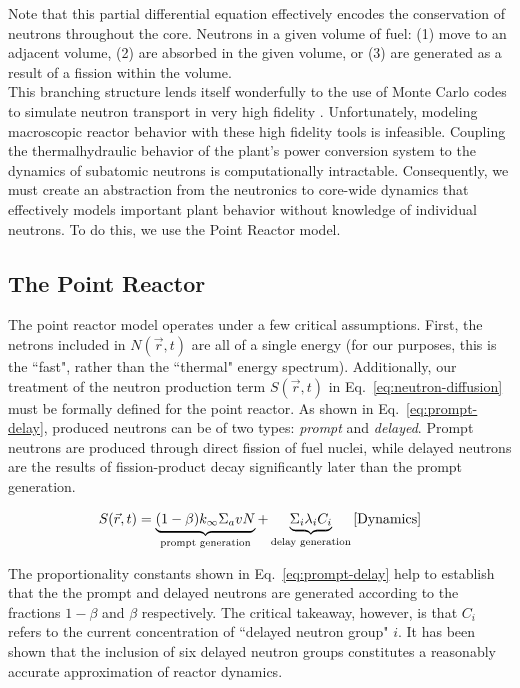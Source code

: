 \documentclass[review,onefignum,onetabnum]{siamart171218}
\begin{document}
Note that this partial differential equation effectively encodes the
conservation of neutrons throughout the core. Neutrons in a given volume of
fuel: (1) move to an adjacent volume, (2) are absorbed in the given
volume, or (3) are generated as a result of a fission within the volume.\\

This branching structure lends itself wonderfully to the use of
Monte Carlo codes to simulate neutron transport in very high fidelity \cite{Serpent}.
Unfortunately, modeling macroscopic reactor behavior with these high fidelity
tools is infeasible. Coupling the thermalhydraulic behavior of the plant's
power conversion system to the dynamics of subatomic neutrons is
computationally intractable. Consequently, we must create an abstraction from
the neutronics to core-wide dynamics that effectively models important plant
behavior without knowledge of individual neutrons. To do this, we use the
Point Reactor model.

\subsection{The Point Reactor}
The point reactor model operates under a few critical assumptions. First,
the netrons included in $N(\vec{r}, t)$ are all of a single
energy (for our purposes, this is the ``fast", rather than the ``thermal" energy spectrum).
Additionally, our treatment of the neutron production term $S(\vec{r}, t)$
in Eq.~\cref{eq:neutron-diffusion} must be formally defined for the point
reactor. As shown in Eq.~\cref{eq:prompt-delay}, produced neutrons can be of
two types: \emph{prompt} and \emph{delayed}. Prompt neutrons are produced
through direct fission of fuel nuclei, while delayed neutrons are the
results of fission-product decay significantly later than the prompt
generation.

\begin{equation}
  S(\vec{r}, t) = \underbrace{(1-\beta)k_{\infty}\Sigma_avN}_{\text{prompt generation}} + \underbrace{\Sigma_i\lambda_iC_i}_{\text{delay generation}}
  \label{eq:prompt-delay}\cite{Dynamics}
\end{equation}

The proportionality constants shown in Eq.~\cref{eq:prompt-delay} help to
establish that the the prompt and delayed neutrons are generated according to
the fractions $1-\beta$ and $\beta$ respectively. The critical takeaway, however,
is that $C_i$ refers to the current concentration
of ``delayed neutron group" $i$. It has been shown that the inclusion of six
delayed neutron groups constitutes a reasonably accurate approximation of reactor
dynamics.\cite{Keepin} \\
\end{document}
